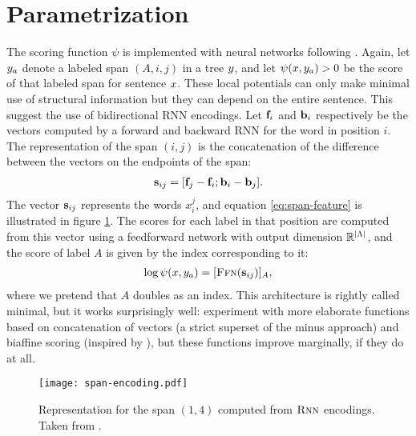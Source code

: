 \section{Parametrization}
  The scoring function $\psi$ is implemented with neural networks following \citet{stern2017minimal}. Again, let $y_a$ denote a labeled span $(A, i, j)$ in a tree $y$, and let $\psi(x, y_a) > 0$ be the score of that labeled span for sentence $x$. These local potentials can only make minimal use of structural information but they can depend on the entire sentence. This suggest the use of bidirectional RNN encodings. Let $\mathbf{f}_i$ and $\mathbf{b}_i$ respectively be the vectors computed by a forward and backward RNN for the word in position $i$. The representation of the span $(i, j)$ is the concatenation of the difference between the vectors on the endpoints of the span:
  \begin{align}
    \label{eq:span-feature}
    \mathbf{s}_{ij} = [\mathbf{f}_j - \mathbf{f}_i; \mathbf{b}_i - \mathbf{b}_j].
  \end{align}
  The vector $\mathbf{s}_{ij}$ represents the words $x_i^j$, and equation \ref{eq:span-feature} is illustrated in figure \ref{fig:span-feature}. The scores for each label in that position are computed from this vector using a feedforward network with output dimension $\mathbb{R}^{\lvert \Lambda \rvert}$, and the score of label $A$ is given by the index corresponding to it:
  \begin{align}
    \label{eq:potential-function}
    \log \psi(x, y_a) = [ \textsc{Ffn}( \mathbf{s}_{ij} ) ]_{A},
  \end{align}
  where we pretend that $A$ doubles as an index. This architecture is rightly called minimal, but it works surprisingly well: \citet{stern2017minimal} experiment with more elaborate functions based on concatenation of vectors (a strict superset of the minus approach) and biaffine scoring (inspired by \citet{dozat2016deep}), but these functions improve marginally, if they do at all.

  \begin{figure}
    \texttt{[image: span-encoding.pdf]}
    \caption{Representation for the span $(1, 4)$ computed from $\textsc{Rnn}$ encodings. Taken from \citet{stern2018analyis}.}
    \label{fig:span-feature}
  \end{figure}

